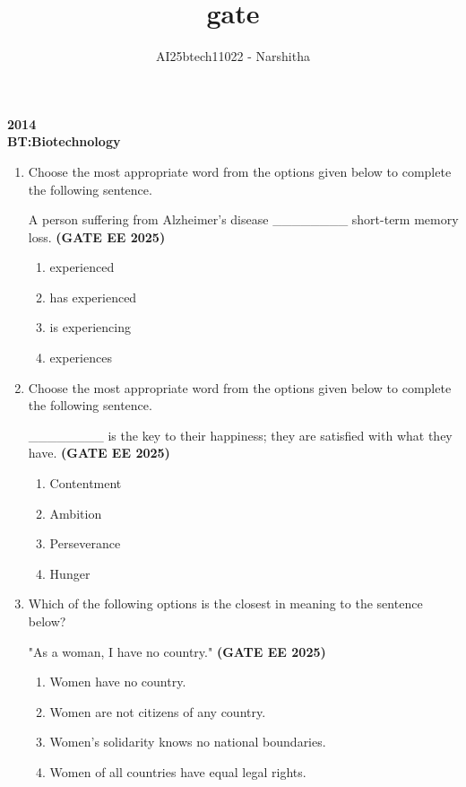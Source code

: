 \documentclass[journal,12pt,onecolumn]{IEEEtran}
\theoremstyle{remark}
\begin{document}
\title{gate}
\author{AI25btech11022 - Narshitha}
\maketitle
\renewcommand{\thefigure}{\theenumi}
\renewcommand{\thetable}{\theenumi}
\begin {center}
\large \textbf{2014}\\
\large \textbf{BT:Biotechnology}\\
\end{center}
\begin{enumerate}
    
    \item Choose the most appropriate word from the options given below to complete the following sentence.  

    A person suffering from Alzheimer's disease \_\_\_\_\_\_\_\_ short-term memory loss.  
\hfill \textbf{(GATE EE 2025)}
    \begin{enumerate} 
        \item experienced
        \item has experienced
        \item is experiencing
        \item experiences
    \end{enumerate}

    \item Choose the most appropriate word from the options given below to complete the following sentence.  

    \_\_\_\_\_\_\_\_ is the key to their happiness; they are satisfied with what they have.  \hfill \textbf{(GATE EE 2025)}

    \begin{enumerate} 
        \item Contentment
        \item Ambition
        \item Perseverance
        \item Hunger
    \end{enumerate}

    \item Which of the following options is the closest in meaning to the sentence below?  

   "As a woman, I have no country."
\hfill \textbf{(GATE EE 2025)}
    \begin{enumerate} 
        \item Women have no country.  
        \item Women are not citizens of any country.  
        \item Women's solidarity knows no national boundaries.  
        \item Women of all countries have equal legal rights.  
    \end{enumerate}


\end{enumerate}
\end{document}
